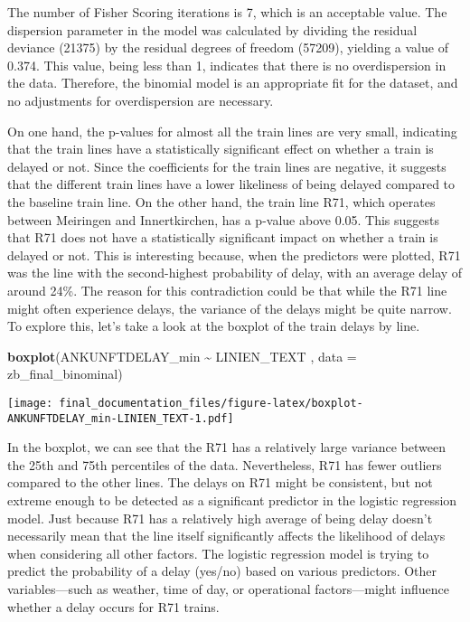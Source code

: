 \documentclass[
]{article}
\newenvironment{Shaded}{\begin{snugshade}}{\end{snugshade}}
\newcommand{\AttributeTok}[1]{\textcolor[rgb]{0.13,0.29,0.53}{#1}}
\newcommand{\FunctionTok}[1]{\textcolor[rgb]{0.13,0.29,0.53}{\textbf{#1}}}
\newcommand{\NormalTok}[1]{#1}
\newcommand{\SpecialCharTok}[1]{\textcolor[rgb]{0.81,0.36,0.00}{\textbf{#1}}}
\begin{document}
The number of Fisher Scoring iterations is 7, which is an acceptable
value. The dispersion parameter in the model was calculated by dividing
the residual deviance (21375) by the residual degrees of freedom
(57209), yielding a value of 0.374. This value, being less than 1,
indicates that there is no overdispersion in the data. Therefore, the
binomial model is an appropriate fit for the dataset, and no adjustments
for overdispersion are necessary.

On one hand, the p-values for almost all the train lines are very small,
indicating that the train lines have a statistically significant effect
on whether a train is delayed or not. Since the coefficients for the
train lines are negative, it suggests that the different train lines
have a lower likeliness of being delayed compared to the baseline train
line. On the other hand, the train line R71, which operates between
Meiringen and Innertkirchen, has a p-value above 0.05. This suggests
that R71 does not have a statistically significant impact on whether a
train is delayed or not. This is interesting because, when the
predictors were plotted, R71 was the line with the second-highest
probability of delay, with an average delay of around 24\%. The reason
for this contradiction could be that while the R71 line might often
experience delays, the variance of the delays might be quite narrow. To
explore this, let's take a look at the boxplot of the train delays by
line.

\begin{Shaded}
\begin{Highlighting}[]
\FunctionTok{boxplot}\NormalTok{(ANKUNFTDELAY\_min }\SpecialCharTok{\textasciitilde{}}\NormalTok{ LINIEN\_TEXT , }\AttributeTok{data =}\NormalTok{ zb\_final\_binominal)}
\end{Highlighting}
\end{Shaded}

\texttt{[image: final\_documentation\_files/figure-latex/boxplot-ANKUNFTDELAY\_min-LINIEN\_TEXT-1.pdf]}

In the boxplot, we can see that the R71 has a relatively large variance
between the 25th and 75th percentiles of the data. Nevertheless, R71 has
fewer outliers compared to the other lines. The delays on R71 might be
consistent, but not extreme enough to be detected as a significant
predictor in the logistic regression model. Just because R71 has a
relatively high average of being delay doesn't necessarily mean that the
line itself significantly affects the likelihood of delays when
considering all other factors. The logistic regression model is trying
to predict the probability of a delay (yes/no) based on various
predictors. Other variables---such as weather, time of day, or
operational factors---might influence whether a delay occurs for R71
trains.
\end{document}
